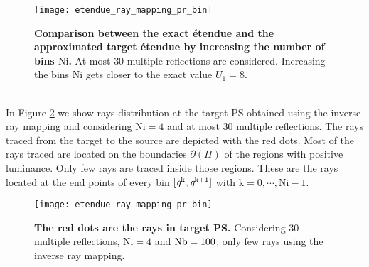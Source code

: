 \begin{figure}[t]
  \begin{center}
  \texttt{[image: etendue\_ray\_mapping\_pr\_bin]}
  \end{center}
  \caption{\textbf{Comparison between the exact \'{e}tendue and the approximated target \'{e}tendue by increasing the number of bins $\textrm{Ni}$.}
 At most $30$ multiple reflections are considered. Increasing the bins $\textrm{Ni}$ gets closer to the exact value $U_1=8$.}
\label{fig:etendue_ray_mapping_pr_bin}
 \end{figure}
\\ \indent In Figure \ref{fig:boundaries_rays_pr_raymapping} we show rays distribution at the target PS obtained using the inverse ray mapping and considering $\textrm{Ni}=4$ and at most $30$ multiple reflections. The rays traced from the target to the source are depicted with the red dots. Most of the rays traced are located on the boundaries $\partial$$(\Pi)$ of the regions with positive luminance. 
Only few rays are traced inside those regions. These are the rays located at the end points of every bin $[\textit{q}^{\textrm{k}}, \textit{q}^{\textrm{k}+1}]$ with $\textrm{k}=0, \cdots, \textrm{Ni}-1$. 
\begin{figure}[h]
  \begin{center}
  \texttt{[image: etendue\_ray\_mapping\_pr\_bin]}
  \end{center}
  \caption{\textbf{The red dots are the rays in target PS.}
 Considering $30$ multiple reflections, $\textrm{Ni}=4$ and $\textrm{Nb} = 100$, only few rays using the inverse ray mapping.}
\label{fig:boundaries_rays_pr_raymapping}
 \end{figure}
\\ \indent
